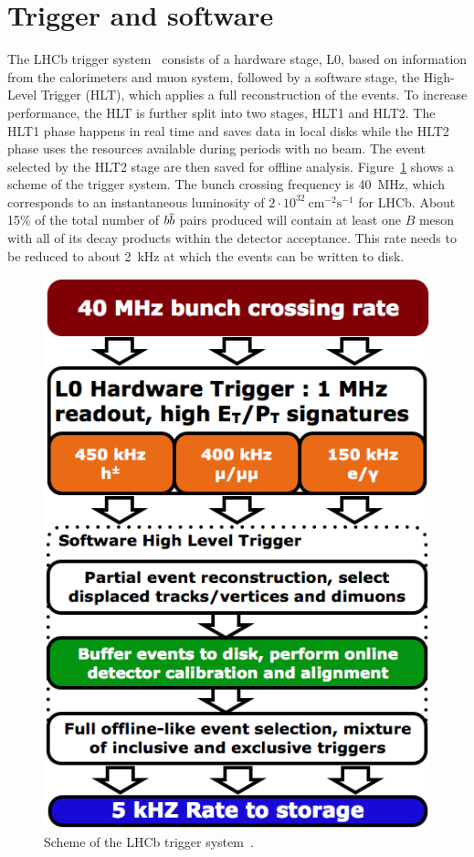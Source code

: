 \section{Trigger and software}
\label{sec:det_trigger}

The LHCb trigger system~\cite{LHCb-DP-2012-004} consists of a hardware stage, L0, based on information
from the calorimeters and muon system, followed by a software stage, the High-Level Trigger (HLT), which applies 
a full reconstruction of the events. To increase performance, the HLT is further split into two stages, HLT1 and HLT2.
The HLT1 phase happens in real time and saves data in local disks while the HLT2 phase uses the resources
available during periods with no beam. The event selected by the HLT2 stage are then saved for offline analysis.
Figure~\ref{fig:triggerscheme} shows a scheme of the trigger system.
The bunch crossing frequency is 40~$\mbox{MHz}$, which corresponds to an instantaneous luminosity of 
$2 \cdot 10^{32} ~\mbox{cm}^{-2} \mbox{s}^{-1}$ for LHCb. About 15\% of the total number of
$b\overline {b}$ pairs produced will contain at least one $B$ meson with all of its decay products 
within the detector acceptance. This rate needs to be reduced to about 2~kHz at which the events
can be written to disk. 
%
\begin{figure}[h!]
\centering 
\includegraphics[width=0.5\linewidth]{Detector/figs/LHCb_Trigger_Split.png}
\caption{Scheme of the LHCb trigger system~\cite{Alves:2008zz}.}
\label{fig:triggerscheme}
\end{figure}

